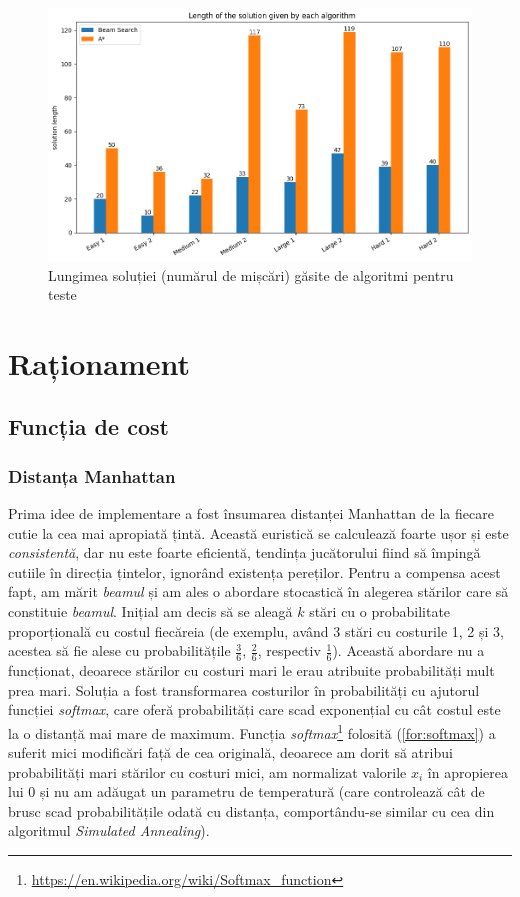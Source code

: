 \documentclass{article}
\begin{document}
\begin{figure}[ht]
    \includegraphics[scale=0.55]{solution/solution_length.png}
    \caption{Lungimea soluției (numărul de mișcări) găsite de algoritmi pentru 
    teste}
    \label{fig:solution_length}
\end{figure}

\section{Raționament}

\subsection{Funcția de cost}

\subsubsection{Distanța Manhattan}
Prima idee de implementare a fost însumarea distanței Manhattan de la fiecare
cutie la cea mai apropiată țintă. Această euristică se calculează foarte ușor și
este \textit{consistentă}, dar nu este foarte eficientă, tendința jucătorului 
fiind să împingă cutiile în direcția țintelor, ignorând existența pereților. 
Pentru a compensa acest fapt, am mărit \textit{beamul} și am ales o abordare
stocastică în alegerea stărilor care să constituie \textit{beamul}. Inițial am
decis să se aleagă $k$ stări cu o probabilitate proporțională cu costul 
fiecăreia (de exemplu, având 3 stări cu costurile 1, 2 și 3, acestea să fie 
alese cu probabilitățile $\frac{3}{6}$, $\frac{2}{6}$, respectiv $\frac{1}{6}$).
Această abordare nu a funcționat, deoarece stărilor cu costuri mari le erau 
atribuite probabilități mult prea mari. Soluția a fost transformarea costurilor
în probabilități cu ajutorul funcției \textit{softmax}, care oferă probabilități
care scad exponențial cu cât costul este la o distanță mai mare de maximum.
Funcția 
\textit{softmax}\footnote{\url{https://en.wikipedia.org/wiki/Softmax_function}}
folosită (\ref{for:softmax}) a suferit mici modificări față de cea originală, 
deoarece am dorit să atribui probabilități mari stărilor cu costuri mici, am 
normalizat valorile $x_i$ în apropierea lui 0 și nu am adăugat un parametru de 
temperatură (care controlează cât de brusc scad probabilitățile odată cu 
distanța, comportându-se similar cu cea din algoritmul \textit{Simulated 
Annealing}).
\end{document}
